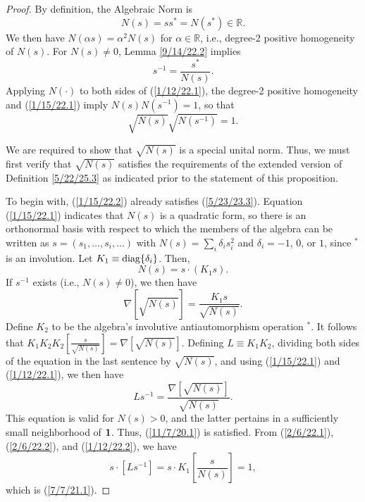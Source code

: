 \documentclass{amsart}
\theoremstyle{definition}
\numberwithin{theorem}{section}
\numberwithin{equation}{section}
\begin{document}
\begin{proof} By definition, the Algebraic Norm is \begin{equation}\label{1/15/22.1} N(s)= ss^* = N(s^*)\in\mathbb{R}.\end{equation} 
 We then have $N(\alpha s) = \alpha^2 N(s)$ for $\alpha\in \mathbb{R}$, i.e., degree-2 positive homogeneity of $N(s)$.  
For $N(s)\ne 0$, Lemma \ref{9/14/22.2} implies 
\begin{equation}\label{1/12/22.1} s^{-1} = \frac{s^*}{N(s)}.\end{equation}
Applying $N(\cdot)$ to both sides of  (\ref{1/12/22.1}), the degree-2 positive homogeneity and (\ref{1/15/22.1}) imply $N(s)N(s^{-1})=1$, so that \begin{equation}\label{1/15/22.2} \sqrt{N(s)}\sqrt{N(s^{-1})}=1. \end{equation}

We are required to show that $\sqrt{N(s)}$ is a special unital norm.  Thus, we must first verify that $\sqrt{N(s)}$ satisfies the requirements of the extended  version of Definition \ref{5/22/25.3} as indicated prior to the statement of this proposition. 

To begin with, (\ref{1/15/22.2}) already satisfies  (\ref{5/23/23.3}).
 Equation (\ref{1/15/22.1}) indicates that $N(s)$ is a quadratic form, so there is an orthonormal basis with respect to which the members of the algebra can be written as $s= (s_1,\dots, s_i,\dots)$ with $N(s) = \sum_i \delta_i s_i^2$ and $\delta_i = -1$, $0$, or $1$, since $^*$ is an involution.  Let $K_1 \equiv {\rm diag}\{\delta_i\}$.   Then, \begin{equation}\label{2/6/22.1} N(s) = s\cdot(K_1 s).\end{equation}
If $s^{-1}$ exists (i.e., $N(s)\ne 0$), we then have \begin{equation}\label{2/6/22.2} \nabla\left[\sqrt{N(s)}\right] = \frac{K_1s}{\sqrt{N(s)}}.\end{equation}  Define $K_2$ to be the algebra's involutive antiautomorphism operation $^*$.  It follows that $K_1K_2K_2[\frac{s}{\sqrt{N(s)}}] = \nabla\left[\sqrt{N(s)}\right]$. Defining $L\equiv K_1K_2$, dividing both sides of the equation in the last sentence by $\sqrt{N(s)}$, and using (\ref{1/15/22.1}) and (\ref{1/12/22.1}), we then have \begin{equation}\label{1/12/22.2} Ls^{-1}  = \frac{\nabla\left[\sqrt{N(s)}\right]}{\sqrt{N(s)}} .\end{equation} This equation  is valid for $N(s)>0$, and the latter pertains in a sufficiently small neighborhood of ${\bf 1}$.  Thus,  (\ref{11/7/20.1}) is satisfied.  From (\ref{2/6/22.1}), (\ref{2/6/22.2}), and (\ref{1/12/22.2}), we have \[ s\cdot [Ls^{-1}] = s\cdot K_1\left[\frac{s}{N(s)}\right] = 1,\] which is (\ref{7/7/21.1}).  
 

\end{proof}
\end{document}
